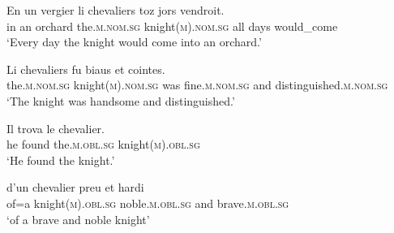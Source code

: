 \documentclass[output=paper,colorlinks,citecolor=brown]{langscibook}
\begin{document}
\begin{exe}
	\ex \label{06ex6}
	\begin{xlist}
		\ex
		\gll En un vergier li chevaliers toz jors vendroit. \\
		in an orchard the.\textsc{m.nom.sg} knight\textsc{(m).nom.sg} all days would\_come \\
		\trans ‘Every day the knight would come into an orchard.’
		
		\ex
		\gll Li chevaliers fu biaus et cointes. \\
		the.\textsc{m.nom.sg} knight\textsc{(m).nom.sg} was fine.\textsc{m.nom.sg} and distinguished.\textsc{m.nom.sg} \\
		\trans ‘The knight was handsome and distinguished.’
		
		\ex
		\gll Il trova le chevalier. \\
		he found the.\textsc{m.obl.sg} knight\textsc{(m).obl.sg} \\
		\trans ‘He found the knight.’
		
		\ex
		\gll d’un chevalier preu et hardi \\
		of=a knight\textsc{(m).obl.sg} noble.\textsc{m.obl.sg} and brave.\textsc{m.obl.sg} \\
		\trans ‘of a brave and noble knight’
	\end{xlist}
\end{exe}
\end{document}
